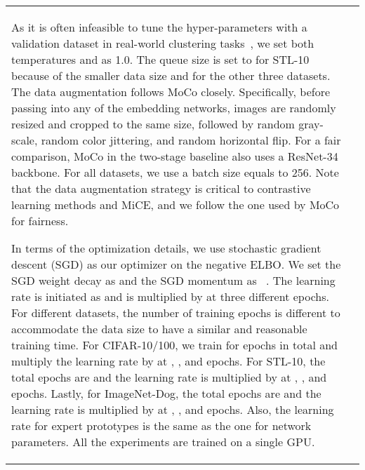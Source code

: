 \documentclass{article} \usepackage{iclr2021_conference,times}
\begin{document}
\begin{table}[t]
\begin{subtable}[h]{0.49\textwidth}
{\begin{tabular}{@{}lc@{}}
As it is often infeasible to tune the hyper-parameters with a validation dataset in real-world clustering tasks~\citep{ghasedi2017deep}, we set both temperatures  and  as 1.0. The queue size  is set to  for STL-10 because of the smaller data size and  for the other three datasets.
The data augmentation follows MoCo closely. Specifically, before passing into any of the embedding networks, images are randomly resized and cropped to the same size, followed by random gray-scale, random color jittering, and random horizontal flip. For a fair comparison, MoCo in the two-stage baseline also uses a ResNet-34 backbone. For all datasets, we use a batch size equals to 256. Note that the data augmentation strategy is critical to contrastive learning methods and MiCE, and we follow the one used by MoCo for fairness. 




In terms of the optimization details, we use stochastic gradient descent (SGD) as our optimizer on the negative ELBO. We set the SGD weight decay as  and the SGD momentum as ~\citep{he2019momentum}. The learning rate is initiated as  and is multiplied by  at three different epochs. For different datasets, the number of training epochs is different to accommodate the data size to have a similar and reasonable training time. For CIFAR-10/100, we train for  epochs in total and multiply the learning rate by  at , , and  epochs. For STL-10, the total epochs are  and the learning rate is multiplied by  at , , and  epochs. Lastly, for ImageNet-Dog, the total epochs are  and the learning rate is multiplied by  at , , and  epochs. Also, the learning rate for expert prototypes is the same as the one for network parameters. All the experiments are trained on a single GPU.



\end{tabular}}
\end{subtable}
\end{table}
\end{document}
